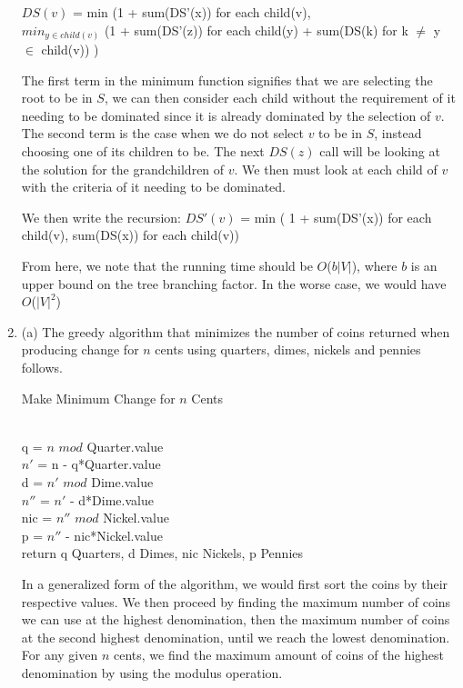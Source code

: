 \documentclass[]{report}
\begin{document}
\begin{enumerate}
	$ DS(v)  $ =   min (1 + sum(DS'(x)) for each child(v), \\
																					$min_{y \in child(v)}$  (1 + sum(DS'(z)) for each child(y) + sum(DS(k) for k $\neq$ y $ \in $ child(v))  )
	
	The first term in the minimum function signifies that we are selecting the root to be in $ S $, we can then consider each child without the requirement of it needing to be dominated since it is already dominated by the selection of $ v $. The second term is the case when we do not select $ v $ to be in $ S $, instead choosing one of its children to be.  The next $ DS(z) $  call will be looking at the solution for the grandchildren of $ v $. We then must look at each child of $ v $ with the criteria of it needing to be dominated. 
	
	We then write the recursion:
	$  DS'(v) $  = min ( 1 + sum(DS'(x)) for each child(v), sum(DS(x)) for each child(v))
	
	From here, we note that the running time should be $ O $($b|V|$), where $ b $ is an upper bound on the tree branching factor. In the worse case, we would have $ O $($|V|^{2}$)
	
	
	
	
	\item 
	(a) The greedy algorithm that minimizes the number of coins returned when producing change for $ \textit{n} $ cents using quarters, dimes, nickels and pennies follows.
	
	\begin{algorithm}
	\caption{Make Minimum Change for $ \textit{n} $ Cents }
	\label{MakeChange}
	\begin{algorithmic}[1]
		 \\		
	    q =  $n$  $mod$ Quarter.value \\
		$n'$ = n - q*Quarter.value \\
		d = $n'$ $mod$ Dime.value \\
		$n''$ = $n'$ - d*Dime.value \\
		nic = $n''$ $mod$ Nickel.value \\
		p = $n''$ - nic*Nickel.value \\
		return q Quarters, d Dimes, nic Nickels, p Pennies
		\EndProcedure
		\end{algorithmic}
	\end{algorithm}
	
	In a generalized form of the algorithm, we would first sort the coins by their respective values. We then proceed by finding the maximum number of coins we can use at the highest denomination, then the maximum number of coins at the second highest denomination, until we reach the lowest denomination. For any given $ \textit{n} $ cents, we find the maximum amount of coins of the highest denomination by using the modulus operation. 
	

\end{enumerate}
\end{document}
